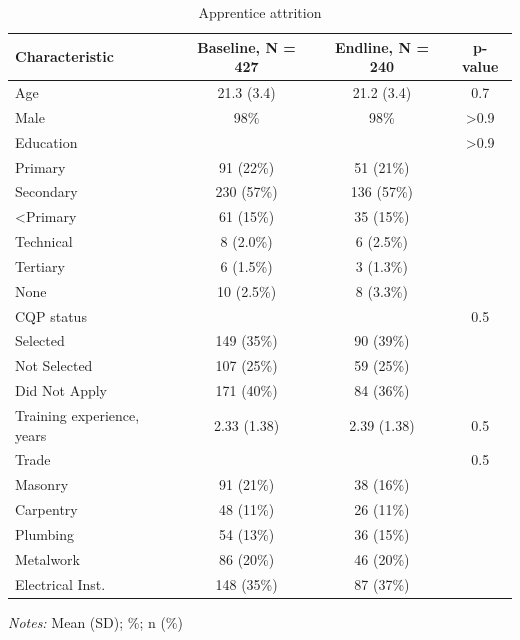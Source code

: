 \documentclass[
  a4paper, twoside, 12pt]{book}
\begin{document}
\begin{singlespacing}
\begin{table}[H]

\caption{\label{tab:tbl-attritionapps}Apprentice attrition}
\centering
\fontsize{9}{11}\selectfont
\begin{threeparttable}
\begin{tabular}[t]{lccc}
\toprule
\textbf{Characteristic} & \textbf{Baseline}, N = 427 & \textbf{Endline}, N = 240 & \textbf{p-value}\\
\midrule
Age & 21.3 (3.4) & 21.2 (3.4) & 0.7\\
Male & 98\% & 98\% & >0.9\\
Education &  &  & >0.9\\
\hspace{1em}Primary & 91 (22\%) & 51 (21\%) & \\
\hspace{1em}Secondary & 230 (57\%) & 136 (57\%) & \\
\hspace{1em}<Primary & 61 (15\%) & 35 (15\%) & \\
\hspace{1em}Technical & 8 (2.0\%) & 6 (2.5\%) & \\
\hspace{1em}Tertiary & 6 (1.5\%) & 3 (1.3\%) & \\
\hspace{1em}None & 10 (2.5\%) & 8 (3.3\%) & \\
CQP status &  &  & 0.5\\
\hspace{1em}Selected & 149 (35\%) & 90 (39\%) & \\
\hspace{1em}Not Selected & 107 (25\%) & 59 (25\%) & \\
\hspace{1em}Did Not Apply & 171 (40\%) & 84 (36\%) & \\
Training experience, years & 2.33 (1.38) & 2.39 (1.38) & 0.5\\
Trade &  &  & 0.5\\
\hspace{1em}Masonry & 91 (21\%) & 38 (16\%) & \\
\hspace{1em}Carpentry & 48 (11\%) & 26 (11\%) & \\
\hspace{1em}Plumbing & 54 (13\%) & 36 (15\%) & \\
\hspace{1em}Metalwork & 86 (20\%) & 46 (20\%) & \\
\hspace{1em}Electrical Inst. & 148 (35\%) & 87 (37\%) & \\
\bottomrule
\end{tabular}
\begin{tablenotes}
\item \textit{Notes:} Mean (SD); \%; n (\%)
\end{tablenotes}
\end{threeparttable}
\end{table}




\end{singlespacing}
\end{document}
